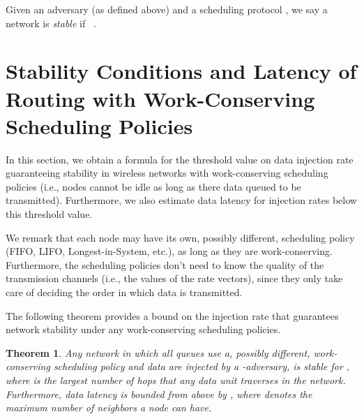 \documentclass[journal,twocolumn]{./IEEEtran}
\newtheorem{theorem}{Theorem}
\begin{document}
Given an adversary  (as defined above) and a scheduling protocol , we say a network  is \emph{stable} if ~\cite{DBLP:journals/talg/AndrewsZ07}.




\section{Stability Conditions and Latency of Routing with
Work-Conserving Scheduling Policies}
\label{sec:wc}

In this section, we obtain 
a formula for
the threshold value on data injection rate guaranteeing stability in wireless networks with work-conserving scheduling policies (i.e., nodes cannot be idle as long as there data queued to be transmitted). Furthermore, we also estimate data latency for injection rates below this threshold value.



We remark that each node may have its own, possibly different, scheduling policy (FIFO, LIFO, Longest-in-System, etc.), as long as they are work-conserving. Furthermore, the scheduling policies don't need to know the quality of the transmission channels (i.e., the values of the rate vectors), since they only take care of deciding the order in which data is transmitted.


The following theorem provides a bound on the injection rate that guarantees network stability under any work-conserving scheduling
policies.



\begin{theorem}
\label{ref:workconservingtheorem}
Any network in which all queues use a, possibly different, work-conserving scheduling policy and data 
are
injected by a -adversary, is stable 
for
, where  is the largest number of hops that any data unit 
traverses
in the network. 
Furthermore, 
data latency
is bounded from above by , where  denotes the maximum number of neighbors a node can have.
\end{theorem}
\end{document}
